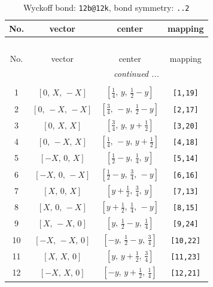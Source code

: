 \documentclass[fleqn,8pt]{jsarticle}
\begin{document}
\renewcommand{\arraystretch}{1.2}
\begin{longtable}{cccc}
\caption{Wyckoff bond: {\tt 12b@12k}, bond symmetry: {\tt ..2}}
 \\
 \hline \hline
No. & vector & center & mapping \\ \hline \endfirsthead

\multicolumn{3}{l}{\tablename\ \thetable{}} \\
 \hline \hline
No. & vector & center & mapping \\ \hline \endhead

 \hline \hline
\multicolumn{3}{r}{\footnotesize\it continued ...} \\ \endfoot

 \hline \hline
\multicolumn{3}{r}{} \\ \endlastfoot

1 & $\left[ 0,\, X,\, - X \right]$ & $\left[ \frac{1}{4},\, y,\, \frac{1}{2} - y \right]$ & {\tt [1,19]} \\ \hline
2 & $\left[ 0,\, - X,\, - X \right]$ & $\left[ \frac{3}{4},\, - y,\, \frac{1}{2} - y \right]$ & {\tt [2,17]} \\ \hline
3 & $\left[ 0,\, X,\, X \right]$ & $\left[ \frac{3}{4},\, y,\, y + \frac{1}{2} \right]$ & {\tt [3,20]} \\ \hline
4 & $\left[ 0,\, - X,\, X \right]$ & $\left[ \frac{1}{4},\, - y,\, y + \frac{1}{2} \right]$ & {\tt [4,18]} \\ \hline
5 & $\left[ - X,\, 0,\, X \right]$ & $\left[ \frac{1}{2} - y,\, \frac{1}{4},\, y \right]$ & {\tt [5,14]} \\ \hline
6 & $\left[ - X,\, 0,\, - X \right]$ & $\left[ \frac{1}{2} - y,\, \frac{3}{4},\, - y \right]$ & {\tt [6,16]} \\ \hline
7 & $\left[ X,\, 0,\, X \right]$ & $\left[ y + \frac{1}{2},\, \frac{3}{4},\, y \right]$ & {\tt [7,13]} \\ \hline
8 & $\left[ X,\, 0,\, - X \right]$ & $\left[ y + \frac{1}{2},\, \frac{1}{4},\, - y \right]$ & {\tt [8,15]} \\ \hline
9 & $\left[ X,\, - X,\, 0 \right]$ & $\left[ y,\, \frac{1}{2} - y,\, \frac{1}{4} \right]$ & {\tt [9,24]} \\ \hline
10 & $\left[ - X,\, - X,\, 0 \right]$ & $\left[ - y,\, \frac{1}{2} - y,\, \frac{3}{4} \right]$ & {\tt [10,22]} \\ \hline
11 & $\left[ X,\, X,\, 0 \right]$ & $\left[ y,\, y + \frac{1}{2},\, \frac{3}{4} \right]$ & {\tt [11,23]} \\ \hline
12 & $\left[ - X,\, X,\, 0 \right]$ & $\left[ - y,\, y + \frac{1}{2},\, \frac{1}{4} \right]$ & {\tt [12,21]} \\
\end{longtable}
\end{document}
